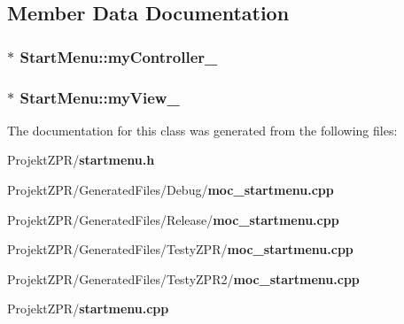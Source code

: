 \subsection{Member Data Documentation}
\subsubsection[{my\-Controller\-\_\-}]{$\ast$ Start\-Menu\-::my\-Controller\-\_\-\hspace{0.3cm}{\ttfamily [private]}}\label{class_start_menu_a175f033340fdbeae0d9264001c9aed27}
\subsubsection[{my\-View\-\_\-}]{$\ast$ Start\-Menu\-::my\-View\-\_\-\hspace{0.3cm}{\ttfamily [private]}}\label{class_start_menu_a686aafb8e0a2ae7ed6f9ba40e6369734}


The documentation for this class was generated from the following files\-:\begin{DoxyCompactItemize}
\item 
Projekt\-Z\-P\-R/{\bf startmenu.\-h}\item 
Projekt\-Z\-P\-R/\-Generated\-Files/\-Debug/{\bf moc\-\_\-startmenu.\-cpp}\item 
Projekt\-Z\-P\-R/\-Generated\-Files/\-Release/{\bf moc\-\_\-startmenu.\-cpp}\item 
Projekt\-Z\-P\-R/\-Generated\-Files/\-Testy\-Z\-P\-R/{\bf moc\-\_\-startmenu.\-cpp}\item 
Projekt\-Z\-P\-R/\-Generated\-Files/\-Testy\-Z\-P\-R2/{\bf moc\-\_\-startmenu.\-cpp}\item 
Projekt\-Z\-P\-R/{\bf startmenu.\-cpp}\end{DoxyCompactItemize}
